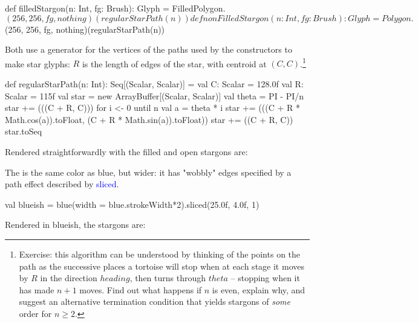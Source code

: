 \documentclass[12pt,a4paper]{article}
\def\Scala#1{\textcolor{blue}{\textsf{#1}}}
\begin{document}
\begin{scala}
 def filledStargon(n: Int, fg: Brush): Glyph =
     FilledPolygon.$(256, 256, fg, nothing)(regularStarPath(n))                        
   
 def nonFilledStargon(n: Int, fg: Brush): Glyph =
     Polygon.$(256, 256, fg, nothing)(regularStarPath(n))                    
\end{scala}


Both use a generator for the vertices of the paths used by
the  constructors to make star glyphs: $R$ is the
length of edges of the star, with centroid at $(C,C)$.\footnote{Exercise: this
algorithm can be understood by thinking of the points on
the path as the successive places a tortoise will stop when
at each stage it moves by $R$ in the direction $heading$, then turns through
$theta$ -- stopping when it has made $n+1$ moves.
Find out what happens if $n$ is even, explain why, and suggest
an alternative termination condition that yields stargons of \textit{some} order for
$n\ge{}2$. }

\begin{scala}
def regularStarPath(n: Int): Seq[(Scalar, Scalar)] = {
    val C: Scalar = 128.0f
    val R: Scalar = 115f
    val star = new ArrayBuffer[(Scalar, Scalar)]
    val theta = PI - PI/n
    star += (((C + R, C)))
    for {i <- 0 until n} {
      val a = theta * i
      star += (((C + R * Math.cos(a)).toFloat, (C + R * Math.sin(a)).toFloat))
    }
    star += ((C + R, C))
    star.toSeq
  }
\end{scala}

Rendered straightforwardly with  the filled and open stargons are:
\begin{center}
\quad\quad
{}
\end{center}


 The   is the same color as blue, but wider: it
 has "wobbly" edges specified by a path effect described by \Scala{sliced}.

\begin{scala}
  val blueish =
        blue(width = blue.strokeWidth*2).sliced(25.0f, 4.0f, 1)
\end{scala}

Rendered in blueish, the stargons are:
\begin{center}
\quad\quad
{}
\end{center}
\end{document}

